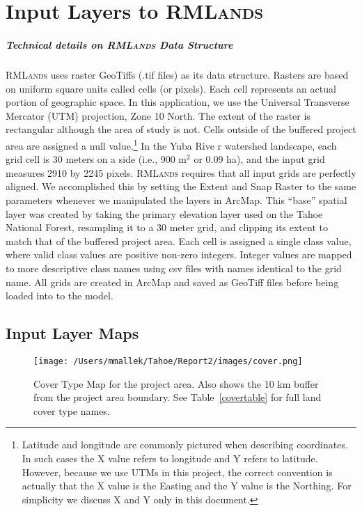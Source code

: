 \appendix


\chapter{Input Layers to \textsc{RMLands}}
\label{app:inputs}

\paragraph{Technical details on \textsc{RMLands} Data Structure}
\label{app:rmlspecs}
\textsc{RMLands} uses raster GeoTiffs (.tif files) as its data structure. Rasters are based on uniform square units called cells (or pixels). Each cell represents an actual portion of geographic space. In this application, we use the Universal Transverse Mercator (UTM) projection, Zone 10 North. The extent of the raster is rectangular although the area of study is not. Cells outside of the buffered project area are assigned a null value.\footnote{Latitude and longitude are commonly pictured when describing coordinates. In such cases the X value refers to longitude and Y refers to latitude. However, because we use UTMs in this project, the correct convention is actually that the X value is the Easting and the Y value is the Northing. For simplicity we discuss X and Y only in this document.} In the Yuba Rive  r watershed landscape, each grid cell is 30 meters on a side (i.e., 900 m$^2$ or 0.09 ha), and the input grid measures 2910 by 2245 pixels. \textsc{RMLands} requires that all input grids are perfectly aligned. We accomplished this by setting the Extent and Snap Raster to the same parameters whenever we manipulated the layers in ArcMap. This ``base'' spatial layer was created by taking the primary elevation layer used on the Tahoe National Forest, resampling it to a 30 meter grid, and clipping its extent to match that of the buffered project area. Each cell is assigned a single class value, where valid class values are positive non-zero integers. Integer values are mapped to more descriptive class names using csv files with names identical to the grid name. All grids are created in ArcMap and saved as GeoTiff files before being loaded into to the model. 

\section{Input Layer Maps}
\label{app:sec:inputmaps}

\begin{figure}[!htbp]
\centering
\texttt{[image: /Users/mmallek/Tahoe/Report2/images/cover.png]}
\caption{Cover Type Map for the project area. Also shows the 10 km buffer from the project area boundary. See Table~\ref{covertable} for full land cover type names.}
\label{covermap}
\end{figure}

